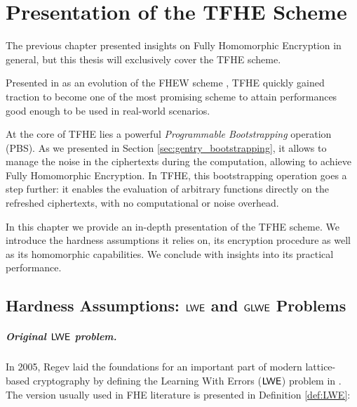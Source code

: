 
\chapter{Presentation of the TFHE Scheme}
\label{chap:spec_tfhe}

The previous chapter presented insights on Fully Homomorphic Encryption in general, but this thesis will exclusively cover the TFHE scheme.

Presented in \cite{JC:CGGI20, these_chillotti} as an evolution of the FHEW scheme \cite{EC:DucMic15}, TFHE quickly gained traction to become one of the most promising scheme to attain performances good enough to be  used in real-world scenarios. 

At the core of TFHE lies a powerful \textit{Programmable Bootstrapping} operation (PBS). As we presented in Section \ref{sec:gentry_bootstrapping}, it allows to manage the noise in the ciphertexts during the computation, allowing to achieve Fully Homomorphic Encryption. In TFHE, this bootstrapping operation goes a step further: it enables the evaluation of arbitrary functions directly on the refreshed ciphertexts, with no computational or noise overhead.

In this chapter we provide an in-depth presentation of the TFHE scheme. We introduce the hardness assumptions it relies on, its encryption procedure as well as its homomorphic capabilities. We conclude with insights into its practical performance.

\section{Hardness Assumptions: $\textsf{LWE}$ and $\textsf{GLWE}$ Problems}
\label{sec:hardness_assumptions}


\paragraph{Original $\textsf{LWE}$ problem.}

In 2005, Regev laid the foundations for an important part of modern lattice-based cryptography by defining the Learning With Errors ($\textsf{LWE}$) problem in \cite{regev_lwe}. The version usually used in FHE literature is presented in Definition \ref{def:LWE}:



